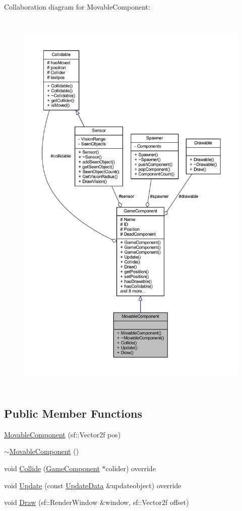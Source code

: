 Collaboration diagram for Movable\-Component\-:\nopagebreak
\begin{figure}[H]
\begin{center}
\leavevmode
\includegraphics[height=550pt]{class_movable_component__coll__graph}
\end{center}
\end{figure}
\subsection*{Public Member Functions}
\begin{DoxyCompactItemize}
\item 
\hyperlink{class_movable_component_aea0453392e1d269a4b4c207728a3ddaf}{Movable\-Component} (sf\-::\-Vector2f pos)
\item 
\hyperlink{class_movable_component_aedc5ac024682262c99436b2b5fadddc1}{$\sim$\-Movable\-Component} ()
\item 
void \hyperlink{class_movable_component_a5ab32fd53c29a29ddcd68f1bb38a5f2b}{Collide} (\hyperlink{class_game_component}{Game\-Component} $\ast$colider) override
\item 
void \hyperlink{class_movable_component_affdc7dddf2207eda3e8a00136adf56ee}{Update} (const \hyperlink{class_update_data}{Update\-Data} \&updateobject) override
\item 
void \hyperlink{class_movable_component_a75c4dad8db642791c52d7fc5e9a92429}{Draw} (sf\-::\-Render\-Window \&window, sf\-::\-Vector2f offset)
\end{DoxyCompactItemize}
